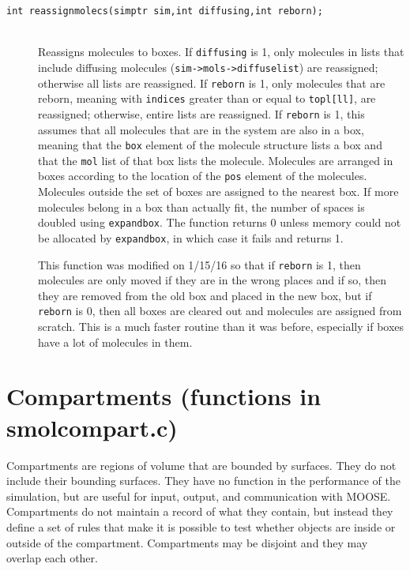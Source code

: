 \documentclass {book}
\begin{document}
\begin{description}
\item[\texttt{int reassignmolecs(simptr sim,int diffusing,int reborn);}]
\hfill \\
Reassigns molecules to boxes. If \texttt{diffusing} is 1, only molecules in lists that include diffusing molecules (\texttt{sim->mols->diffuselist}) are reassigned; otherwise all lists are reassigned. If \texttt{reborn} is 1, only molecules that are reborn, meaning with \texttt{indices} greater than or equal to \texttt{topl[ll]}, are reassigned; otherwise, entire lists are reassigned. If \texttt{reborn} is 1, this assumes that all molecules that are in the system are also in a box, meaning that the \texttt{box} element of the molecule structure lists a box and that the \texttt{mol} list of that box lists the molecule. Molecules are arranged in boxes according to the location of the \texttt{pos} element of the molecules. Molecules outside the set of boxes are assigned to the nearest box. If more molecules belong in a box than actually fit, the number of spaces is doubled using \texttt{expandbox}. The function returns 0 unless memory could not be allocated by \texttt{expandbox}, in which case it fails and returns 1.

This function was modified on 1/15/16 so that if \texttt{reborn} is 1, then molecules are only moved if they are in the wrong places and if so, then they are removed from the old box and placed in the new box, but if \texttt{reborn} is 0, then all boxes are cleared out and molecules are assigned from scratch. This is a much faster routine than it was before, especially if boxes have a lot of molecules in them.

\end{description}

\section{Compartments (functions in smolcompart.c)}

Compartments are regions of volume that are bounded by surfaces. They do not include their bounding surfaces. They have no function in the performance of the simulation, but are useful for input, output, and communication with MOOSE. Compartments do not maintain a record of what they contain, but instead they define a set of rules that make it is possible to test whether objects are inside or outside of the compartment. Compartments may be disjoint and they may overlap each other.
\end{document}
